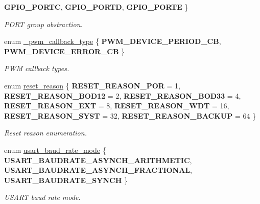 \begin{DoxyCompactItemize}
{\bfseries G\+P\+I\+O\+\_\+\+P\+O\+R\+TC}, 
{\bfseries G\+P\+I\+O\+\_\+\+P\+O\+R\+TD}, 
\newline
{\bfseries G\+P\+I\+O\+\_\+\+P\+O\+R\+TE}
 \}\begin{DoxyCompactList}\small\item\em P\+O\+RT group abstraction. \end{DoxyCompactList}
\item 
\mbox{\label{group___h_p_l_gaa279abe5a858ccbaea89be01192a2d6c}} 
enum \hyperlink{group___h_p_l_gaa279abe5a858ccbaea89be01192a2d6c}{\+\_\+pwm\+\_\+callback\+\_\+type} \{ {\bfseries P\+W\+M\+\_\+\+D\+E\+V\+I\+C\+E\+\_\+\+P\+E\+R\+I\+O\+D\+\_\+\+CB}, 
{\bfseries P\+W\+M\+\_\+\+D\+E\+V\+I\+C\+E\+\_\+\+E\+R\+R\+O\+R\+\_\+\+CB}
 \}\begin{DoxyCompactList}\small\item\em P\+WM callback types. \end{DoxyCompactList}
\item 
enum \hyperlink{group___h_p_l_ga9066b7b3f20c4514ad24dcbff8fa3898}{reset\+\_\+reason} \{ \newline
{\bfseries R\+E\+S\+E\+T\+\_\+\+R\+E\+A\+S\+O\+N\+\_\+\+P\+OR} = 1, 
{\bfseries R\+E\+S\+E\+T\+\_\+\+R\+E\+A\+S\+O\+N\+\_\+\+B\+O\+D12} = 2, 
{\bfseries R\+E\+S\+E\+T\+\_\+\+R\+E\+A\+S\+O\+N\+\_\+\+B\+O\+D33} = 4, 
{\bfseries R\+E\+S\+E\+T\+\_\+\+R\+E\+A\+S\+O\+N\+\_\+\+E\+XT} = 8, 
\newline
{\bfseries R\+E\+S\+E\+T\+\_\+\+R\+E\+A\+S\+O\+N\+\_\+\+W\+DT} = 16, 
{\bfseries R\+E\+S\+E\+T\+\_\+\+R\+E\+A\+S\+O\+N\+\_\+\+S\+Y\+ST} = 32, 
{\bfseries R\+E\+S\+E\+T\+\_\+\+R\+E\+A\+S\+O\+N\+\_\+\+B\+A\+C\+K\+UP} = 64
 \}\begin{DoxyCompactList}\small\item\em Reset reason enumeration. \end{DoxyCompactList}
\item 
\mbox{\label{group___h_p_l_ga59141b5eb86f4d53f17bbeab1d7c83e7}} 
enum \hyperlink{group___h_p_l_ga59141b5eb86f4d53f17bbeab1d7c83e7}{usart\+\_\+baud\+\_\+rate\+\_\+mode} \{ {\bfseries U\+S\+A\+R\+T\+\_\+\+B\+A\+U\+D\+R\+A\+T\+E\+\_\+\+A\+S\+Y\+N\+C\+H\+\_\+\+A\+R\+I\+T\+H\+M\+E\+T\+IC}, 
{\bfseries U\+S\+A\+R\+T\+\_\+\+B\+A\+U\+D\+R\+A\+T\+E\+\_\+\+A\+S\+Y\+N\+C\+H\+\_\+\+F\+R\+A\+C\+T\+I\+O\+N\+AL}, 
{\bfseries U\+S\+A\+R\+T\+\_\+\+B\+A\+U\+D\+R\+A\+T\+E\+\_\+\+S\+Y\+N\+CH}
 \}\begin{DoxyCompactList}\small\item\em U\+S\+A\+RT baud rate mode. \end{DoxyCompactList}

\end{DoxyCompactItemize}
